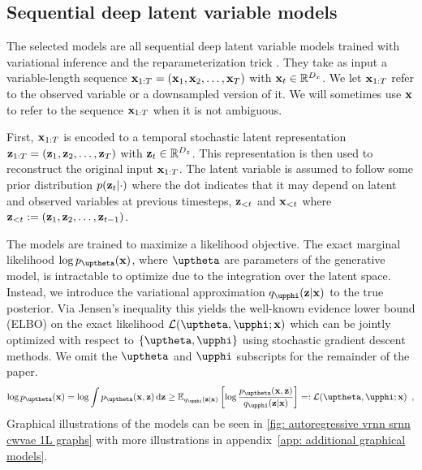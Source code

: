 {\subsection{Sequential deep latent variable models}
The selected models are all sequential deep latent variable models trained with variational inference and the reparameterization trick \parencite{kingma_autoencoding_2014}.
They take as input a variable-length sequence ${\mathbf{x}}_{1:T} = \left({\mathbf{x}}_1, {\mathbf{x}}_2, \dots, {\mathbf{x}}_{T}\right)$ with ${\mathbf{x}}_t \in \mathbb{R}^{D_x}$. 
We let ${\mathbf{x}}_{1:T}$ refer to the observed variable or a downsampled version of it. We will sometimes use ${\mathbf{x}}$ to refer to the sequence ${\mathbf{x}}_{1:T}$ when it is not ambiguous.

First, ${\mathbf{x}}_{1:T}$ is encoded to a temporal stochastic latent representation ${\mathbf{z}}_{1:T} = \left( {\mathbf{z}}_1, {\mathbf{z}}_2, \dots, {\mathbf{z}}_{T} \right)$ with ${\mathbf{z}}_t\in \mathbb{R}^{D_z}$. This representation is then used to reconstruct the original input ${\mathbf{x}}_{1:T}$.
The latent variable is assumed to follow some prior distribution $p({\mathbf{z}}_t|\cdot)$ where the dot indicates that it may depend on latent and observed variables at previous timesteps, ${\mathbf{z}}_{<t}$ and ${\mathbf{x}}_{<t}$ where ${\mathbf{z}}_{<t} := \left( {\mathbf{z}}_1, {\mathbf{z}}_2, \dots, {\mathbf{z}}_{t-1} \right)$. 

The models are trained to maximize a likelihood objective. The exact marginal likelihood $\log p_\thetab(\xb)$, where $\thetab$ are parameters of the generative model, is intractable to optimize due to the integration over the latent space. Instead, we introduce the variational approximation $q_\phib(\zb|\xb)$ to the true posterior. Via Jensen's inequality this yields the well-known evidence lower bound (ELBO) on the exact likelihood $\mathcal{L}(\thetab,\phib;\xb)$
which can be jointly optimized with respect to  $\{\thetab, \phib\}$ using stochastic gradient descent methods. We omit the $\thetab$ and $\phib$ subscripts for the remainder of the paper.
\begin{equation}
    \log p_\thetab(\xb) = \log \int p_\thetab(\xb,\zb) \, \mathrm{d}\zb  \geq \mathbb{E}_{q_\phib(\zb|\xb)} \left[ \log \frac{p_\thetab(\xb,\zb)}{q_\phib(\zb|\xb)} \right] =: \mathcal{L}(\thetab,\phib;\xb) \label{eq: elbo} \enspace,
\end{equation}
Graphical illustrations of the models can be seen in \cref{fig: autoregressive vrnn srnn cwvae 1L graphs} with more illustrations in appendix~\cref{app: additional graphical models}.


}
